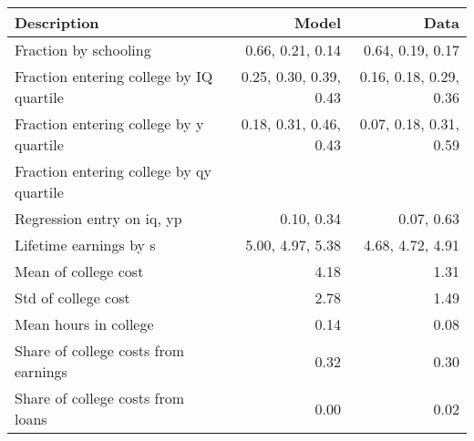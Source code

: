 \begin{tabular}{lrr}
\hline
Description & Model  & Data  \\
\hline
Fraction by schooling & 0.66, 0.21, 0.14  & 0.64, 0.19, 0.17  \\
Fraction entering college by IQ quartile & 0.25, 0.30, 0.39, 0.43  & 0.16, 0.18, 0.29, 0.36  \\
Fraction entering college by y quartile & 0.18, 0.31, 0.46, 0.43  & 0.07, 0.18, 0.31, 0.59  \\
Fraction entering college by qy quartile &   &   \\
Regression entry on iq, yp & 0.10, 0.34  & 0.07, 0.63  \\
Lifetime earnings by s & 5.00, 4.97, 5.38  & 4.68, 4.72, 4.91  \\
Mean of college cost & 4.18  & 1.31  \\
Std of college cost & 2.78  & 1.49  \\
Mean hours in college & 0.14  & 0.08  \\
Share of college costs from earnings & 0.32  & 0.30  \\
Share of college costs from loans & 0.00  & 0.02  \\
\hline
\end{tabular}%
